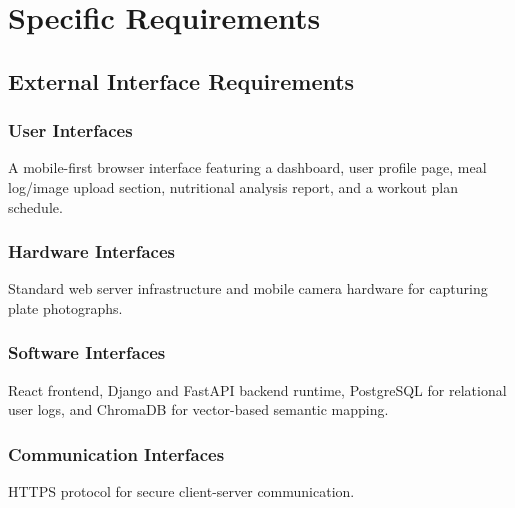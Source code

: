 \documentclass[11pt,a4paper]{article}
\begin{document}
\section{Specific Requirements}

\subsection{External Interface Requirements}
\subsubsection{User Interfaces}
A mobile-first browser interface featuring a dashboard, user profile page, meal log/image upload section, nutritional analysis report, and a workout plan schedule.
\subsubsection{Hardware Interfaces}
Standard web server infrastructure and mobile camera hardware for capturing plate photographs.
\subsubsection{Software Interfaces}
React frontend, Django and FastAPI backend runtime, PostgreSQL for relational user logs, and ChromaDB for vector-based semantic mapping.
\subsubsection{Communication Interfaces}
HTTPS protocol for secure client-server communication.
\end{document}
